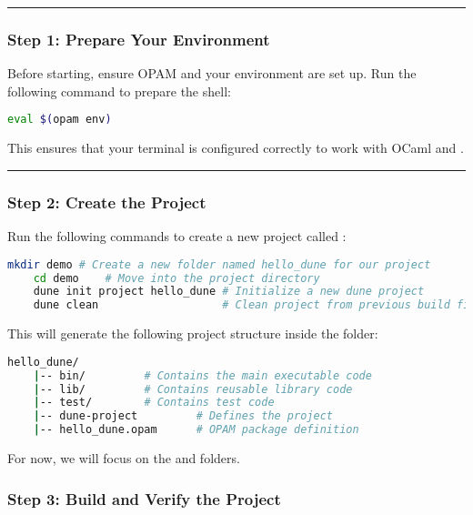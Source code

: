 \noindent
\rule{\textwidth}{0.4pt}
\subsubsection{Step 1: Prepare Your Environment}

Before starting, ensure OPAM and your environment are set up. Run the following command to prepare the shell:

\begin{lstlisting}[language=Bash, caption={Preparing Your OPAM Environment}]
    eval $(opam env)
\end{lstlisting}

\noindent
This ensures that your terminal is configured correctly to work with OCaml and .\\
\rule{\textwidth}{0.4pt}

\subsubsection{Step 2: Create the Project}

\noindent
Run the following commands to create a new  project called :

\begin{lstlisting}[language=Bash, caption={Creating the Project}]
    mkdir demo # Create a new folder named hello_dune for our project
    cd demo    # Move into the project directory
    dune init project hello_dune # Initialize a new dune project
    dune clean                   # Clean project from previous build files
\end{lstlisting}

\noindent
This will generate the following project structure inside the  folder:
\begin{lstlisting}[language=Bash, caption={Generated Project Structure}]
    hello_dune/
    |-- bin/         # Contains the main executable code
    |-- lib/         # Contains reusable library code
    |-- test/        # Contains test code
    |-- dune-project         # Defines the project
    |-- hello_dune.opam      # OPAM package definition
\end{lstlisting}

\noindent
For now, we will focus on the  and  folders.

\subsubsection{Step 3: Build and Verify the Project}

